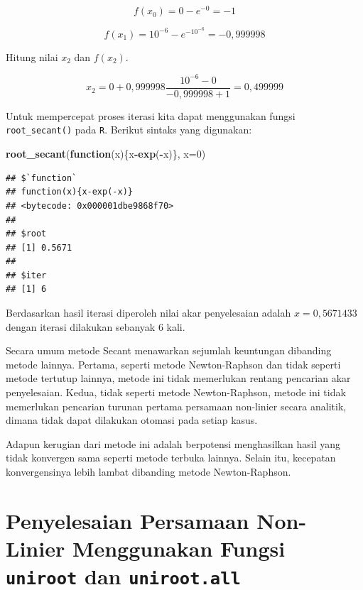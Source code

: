 \documentclass[
]{book}
\newenvironment{Shaded}{\begin{snugshade}}{\end{snugshade}}
\newcommand{\AttributeTok}[1]{\textcolor[rgb]{0.13,0.29,0.53}{#1}}
\newcommand{\ControlFlowTok}[1]{\textcolor[rgb]{0.13,0.29,0.53}{\textbf{#1}}}
\newcommand{\DecValTok}[1]{\textcolor[rgb]{0.00,0.00,0.81}{#1}}
\newcommand{\FunctionTok}[1]{\textcolor[rgb]{0.13,0.29,0.53}{\textbf{#1}}}
\newcommand{\NormalTok}[1]{#1}
\newcommand{\SpecialCharTok}[1]{\textcolor[rgb]{0.81,0.36,0.00}{\textbf{#1}}}
\theoremstyle{definition}
\theoremstyle{definition}
\theoremstyle{definition}
\theoremstyle{definition}
\theoremstyle{remark}
\begin{document}
\[
f\left(x_0 \right)=0-e^{-0}=-1
\]

\[
f\left(x_1 \right)=10^{-6}-e^{-10^{-6}}=-0,999998
\]

Hitung nilai \(x_2\) dan \(f\left(x_2 \right)\).

\[
x_2=0+0,999998\frac{10^{-6}-0}{-0,999998+1}=0,499999
\]

Untuk mempercepat proses iterasi kita dapat menggunakan fungsi \texttt{root\_secant()} pada \texttt{R}. Berikut sintaks yang digunakan:

\begin{Shaded}
\begin{Highlighting}[]
\FunctionTok{root\_secant}\NormalTok{(}\ControlFlowTok{function}\NormalTok{(x)\{x}\SpecialCharTok{{-}}\FunctionTok{exp}\NormalTok{(}\SpecialCharTok{{-}}\NormalTok{x)\}, }\AttributeTok{x=}\DecValTok{0}\NormalTok{)}
\end{Highlighting}
\end{Shaded}

\begin{verbatim}
## $`function`
## function(x){x-exp(-x)}
## <bytecode: 0x000001dbe9868f70>
## 
## $root
## [1] 0.5671
## 
## $iter
## [1] 6
\end{verbatim}

Berdasarkan hasil iterasi diperoleh nilai akar penyelesaian adalah \(x=0,5671433\) dengan iterasi dilakukan sebanyak \(6\) kali.

Secara umum metode Secant menawarkan sejumlah keuntungan dibanding metode lainnya. Pertama, seperti metode Newton-Raphson dan tidak seperti metode tertutup lainnya, metode ini tidak memerlukan rentang pencarian akar penyelesaian. Kedua, tidak seperti metode Newton-Raphson, metode ini tidak memerlukan pencarian turunan pertama persamaan non-linier secara analitik, dimana tidak dapat dilakukan otomasi pada setiap kasus.

Adapun kerugian dari metode ini adalah berpotensi menghasilkan hasil yang tidak konvergen sama seperti metode terbuka lainnya. Selain itu, kecepatan konvergensinya lebih lambat dibanding metode Newton-Raphson.

\hypertarget{uniroot}{%
\section{\texorpdfstring{Penyelesaian Persamaan Non-Linier Menggunakan Fungsi \texttt{uniroot} dan \texttt{uniroot.all}}{Penyelesaian Persamaan Non-Linier Menggunakan Fungsi uniroot dan uniroot.all}}\label{uniroot}}
\end{document}
